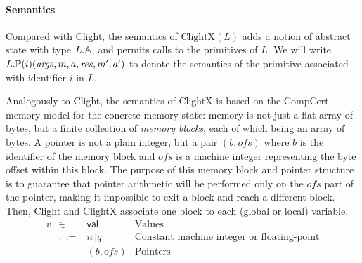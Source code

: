 \paragraph{Semantics}

Compared with Clight, the semantics of $\text{ClightX}(L)$ adds a
notion of abstract state with type $L.\mathbb{A}$, and permits calls to the primitives of $L$.
We will write $L.\mathbb{P}(i)(\mathit{args}, m, a, \mathit{res}, m', a')$ to
denote the semantics of the primitive associated with identifier $i$
in $L$.


Analogously to Clight, the semantics of ClightX is based on the
CompCert memory model \cite{leroy08} for the concrete memory state:
memory is not just a flat array of bytes, but a finite collection of
\emph{memory blocks}, each of which being an array of bytes.  A
pointer is not a plain integer, but a pair $(b, \mathit{ofs})$ where
$b$ is the identifier of the memory block and $\mathit{ofs}$ is a
machine integer representing the byte offset within this block. The
purpose of this memory block and pointer structure is to guarantee
that pointer arithmetic will be performed only on the $\mathit{ofs}$
part of the pointer, making it impossible to exit a block and reach a
different block. Then, Clight and ClightX associate one block to each
(global or local) variable.
\[
\begin{array}{llll}
v & \in & \textsf{val} & \text{Values} \\
& ::= & n \, | q & \text{Constant machine integer or floating-point} \\
& | & (b, \mathit{ofs}) & \text{Pointers}
\end{array}
\]

